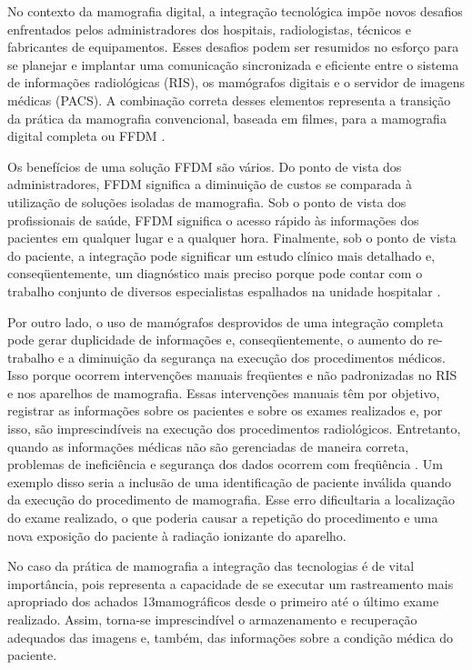 No contexto da mamografia digital, a integração tecnológica impõe novos desafios
enfrentados pelos administradores dos hospitais, radiologistas, técnicos e fabricantes de
equipamentos. Esses desafios podem ser resumidos no esforço para se planejar e implantar
uma comunicação sincronizada e eficiente entre o sistema de informações radiológicas
(RIS), os mamógrafos digitais e o servidor de imagens médicas (PACS). A combinação
correta desses elementos representa a transição da prática da mamografia convencional,
baseada em filmes, para a mamografia digital completa ou FFDM \cite{trambert}.

Os benefícios de uma solução FFDM são vários. Do ponto de vista dos
administradores, FFDM significa a diminuição de custos se comparada à utilização de
soluções isoladas de mamografia. Sob o ponto de vista dos profissionais de saúde, FFDM
significa o acesso rápido às informações dos pacientes em qualquer lugar e a qualquer
hora. Finalmente, sob o ponto de vista do paciente, a integração pode significar um estudo
clínico mais detalhado e, conseqüentemente, um diagnóstico mais preciso porque pode
contar com o trabalho conjunto de diversos especialistas espalhados na unidade hospitalar \cite{trambert}.

Por outro lado, o uso de mamógrafos desprovidos de uma integração completa pode
gerar duplicidade de informações e, conseqüentemente, o aumento do re-trabalho e a
diminuição da segurança na execução dos procedimentos médicos. Isso porque ocorrem
intervenções manuais freqüentes e não padronizadas no RIS e nos aparelhos de
mamografia. Essas intervenções manuais têm por objetivo, registrar as informações sobre
os pacientes e sobre os exames realizados e, por isso, são imprescindíveis na execução dos
procedimentos radiológicos. Entretanto, quando as informações médicas não são
gerenciadas de maneira correta, problemas de ineficiência e segurança dos dados ocorrem
com freqüência \cite{grimes}. Um exemplo disso seria a inclusão de uma identificação
de paciente inválida quando da execução do procedimento de mamografia. Esse erro
dificultaria a localização do exame realizado, o que poderia causar a repetição do
procedimento e uma nova exposição do paciente à radiação ionizante do aparelho.

No caso da prática de mamografia a integração das tecnologias é de vital importância,
pois representa a capacidade de se executar um rastreamento mais apropriado dos achados
13mamográficos desde o primeiro até o último exame realizado. Assim, torna-se
imprescindível o armazenamento e recuperação adequados das imagens e, também, das
informações sobre a condição médica do paciente.

